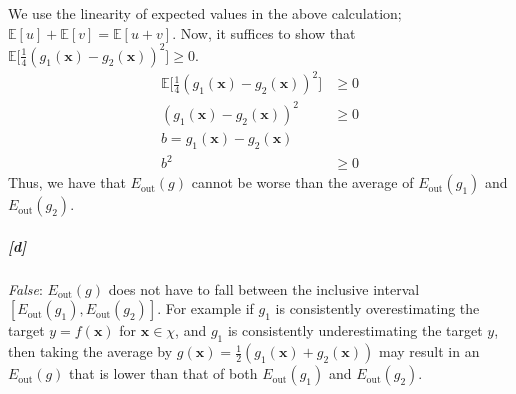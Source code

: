 \documentclass[titlepage]{article}
\begin{document}
	We use the linearity of expected values in the above calculation; $\mathbb E[u] + \mathbb E[v] = \mathbb E [u+v]$. Now, it suffices to show that $\mathbb E \big[  \frac{1}{4}( g_1(\bm x) - g_2(\bm x))^2 \big]  \geq 0$. 
	\begin{align*}
	\mathbb E \big[  \frac{1}{4}( g_1(\bm x) - g_2(\bm x))^2 \big]  &\geq 0 \\
	( g_1(\bm x) - g_2(\bm x))^2 &\geq 0 \\
	b =  g_1(\bm x) - g_2(\bm x) \\
	b^2 &\geq 0
	\end{align*}
	Thus, we have that  $E_{\text{out}}(g)$ cannot be worse than the average of $E_{\text{out}}(g_1)$ and $E_{\text{out}}(g_2)$.

	\subparagraph{[d]} \textit{False}: $E_{\text{out}}(g)$ does not have to fall between the inclusive interval $[E_{\text{out}}(g_1), E_{\text{out}}(g_2)]$. For example if $g_1$ is consistently overestimating the target $y = f(\bm x)$ for $\bm x \in \chi$, and $g_1$ is consistently underestimating the target $y$, then taking the average by $g(\bm x) = \frac{1}{2}(g_1(\bm x) + g_2(\bm x))$ may result in an $E_{\text{out}}(g)$ that is lower than that of both $E_{\text{out}}(g_1)$ and $E_{\text{out}}(g_2)$.
\end{document}
